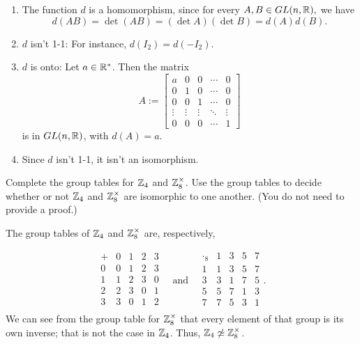 \begin{solution}[print=true]

\begin{enumerate}

\item The function $d$ is a homomorphism, since for every $A,B \in
    GL(n,\mathbb{R}),$ we have
$$d(AB)=\det(AB)=(\det A)(\det B)=d(A)d(B).$$

\item $d$ isn't 1-1: For instance, $d(I_2)=d(-I_2)$.

\item $d$ is onto: Let $a\in \mathbb{R}^*$. Then the matrix
$$A:=\begin{bmatrix}
a & 0 & 0 & \cdots & 0 \\
0 & 1 & 0 & \cdots & 0 \\
0 & 0 & 1 & \cdots & 0 \\
\vdots & \vdots & \vdots & \ddots & \vdots \\
0 & 0 & 0 & \cdots & 1 \end{bmatrix}$$ is in $GL(n,\mathbb{R})$, with $d(A)=a$.

\item Since $d$ isn't 1-1, it isn't  an
isomorphism.
\end{enumerate}
\end{solution}

\begin{exercise}[ID=3B]
Complete the group tables for $\mathbb{Z}_4$ and $\mathbb{Z}_8^{\times}$. Use the group tables to decide whether or not $\mathbb{Z}_4$ and $\mathbb{Z}_8^{\times}$ are isomorphic to one another. (You do not need to provide a proof.)
\end{exercise}

\begin{solution}[print=true]
The group tables of $\mathbb{Z}_4$ and $\mathbb{Z}_8^{\times}$ are, respectively,

\renewcommand{\arraystretch}{1.3}
$$\begin{array}{c||c|c|c|c}
+&0&1&2&3\\ \hline\hline 0&0&1&2&3\\ \hline
1&1&2&3&0\\ \hline 2&2&3&0&1\\ \hline 3&3&0&1&2\\
\end{array} \quad \mbox{and} \quad
\begin{array}{c||c|c|c|c}
\cdot_8&1&3&5&7\\ \hline\hline 1&1&3&5&7\\ \hline 3&3&1&7&5\\
\hline 5&5&7&1&3 \\ \hline 7&7&5&3&1\\
\end{array}.$$
\medskip
We can see from the group table for $\mathbb{Z}_8^{\times}$ that every element of that group is its own inverse; that is not the case in $\mathbb{Z}_4$.  Thus, $\mathbb{Z}_4\not\simeq\mathbb{Z}_8^{\times}$.

\end{solution}

